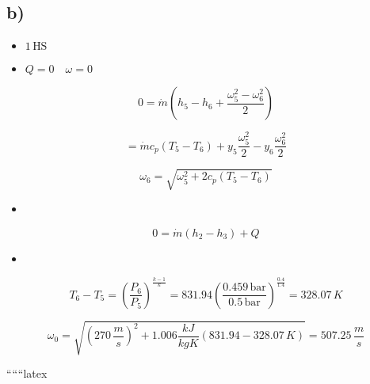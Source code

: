 

\subsection*{b)}

\begin{itemize}
    \item $1 \, \text{HS}$ \quad {}
    \item {} \quad $Q = 0 \quad \omega = 0$
\end{itemize}

\[
0 = \dot{m} (h_5 - h_6 + \frac{\omega_5^2 - \omega_6^2}{2})
\]

\[
= \dot{m} c_p (T_5 - T_6) + y_5 \frac{\omega_5^2}{2} - y_6 \frac{\omega_6^2}{2}
\]

\[
\omega_6 = \sqrt{\omega_5^2 + 2 c_p (T_5 - T_6)}
\]

\begin{itemize}
    \item {}
\end{itemize}

\[
0 = \dot{m} (h_2 - h_3) + Q
\]

\begin{itemize}
    \item {}
\end{itemize}

\[
T_6 - T_5 = \left( \frac{P_6}{P_5} \right)^{\frac{k-1}{k}} = 831.94 \left( \frac{0.459 \, \text{bar}}{0.5 \, \text{bar}} \right)^{\frac{0.4}{1.4}} = 328.07 \, K
\]

\[
\omega_0 = \sqrt{(270 \, \frac{m}{s})^2 + 1.006 \frac{kJ}{kgK} (831.94 - 328.07 \, K)} = 507.25 \, \frac{m}{s}
\]

``````latex